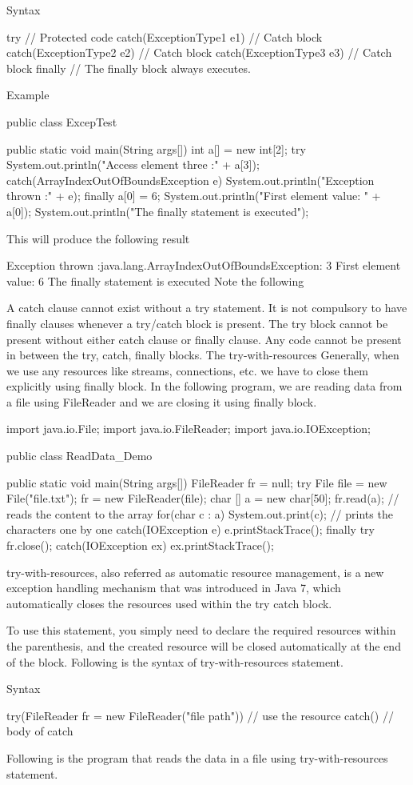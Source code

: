 {Syntax

try {
   // Protected code
}catch(ExceptionType1 e1) {
   // Catch block
}catch(ExceptionType2 e2) {
   // Catch block
}catch(ExceptionType3 e3) {
   // Catch block
}finally {
   // The finally block always executes.
}

Example

public class ExcepTest {

   public static void main(String args[]) {
      int a[] = new int[2];
      try {
         System.out.println("Access element three :" + a[3]);
      }catch(ArrayIndexOutOfBoundsException e) {
         System.out.println("Exception thrown  :" + e);
      }finally {
         a[0] = 6;
         System.out.println("First element value: " + a[0]);
         System.out.println("The finally statement is executed");
      }
   }
}
This will produce the following result

Exception thrown  :java.lang.ArrayIndexOutOfBoundsException: 3
First element value: 6
The finally statement is executed
Note the following

A catch clause cannot exist without a try statement.
It is not compulsory to have finally clauses whenever a try/catch block is present.
The try block cannot be present without either catch clause or finally clause.
Any code cannot be present in between the try, catch, finally blocks.
The try-with-resources
Generally, when we use any resources like streams, connections, etc. we have to close them explicitly using finally block. In the following program, we are reading data from a file using FileReader and we are closing it using finally block.

import java.io.File;
import java.io.FileReader;
import java.io.IOException;

public class ReadData_Demo {

   public static void main(String args[]) {
      FileReader fr = null;
      try {
         File file = new File("file.txt");
         fr = new FileReader(file); char [] a = new char[50];
         fr.read(a);   // reads the content to the array
         for(char c : a)
         System.out.print(c);   // prints the characters one by one
      }catch(IOException e) {
         e.printStackTrace();
      }finally {
         try {
            fr.close();
         }catch(IOException ex) {
            ex.printStackTrace();
         }
      }
   }
}
try-with-resources, also referred as automatic resource management, is a new exception handling mechanism that was introduced in Java 7, which automatically closes the resources used within the try catch block.

To use this statement, you simply need to declare the required resources within the parenthesis, and the created resource will be closed automatically at the end of the block. Following is the syntax of try-with-resources statement.

Syntax

try(FileReader fr = new FileReader("file path")) {
   // use the resource
   }catch() {
      // body of catch
   }
}
Following is the program that reads the data in a file using try-with-resources statement.

